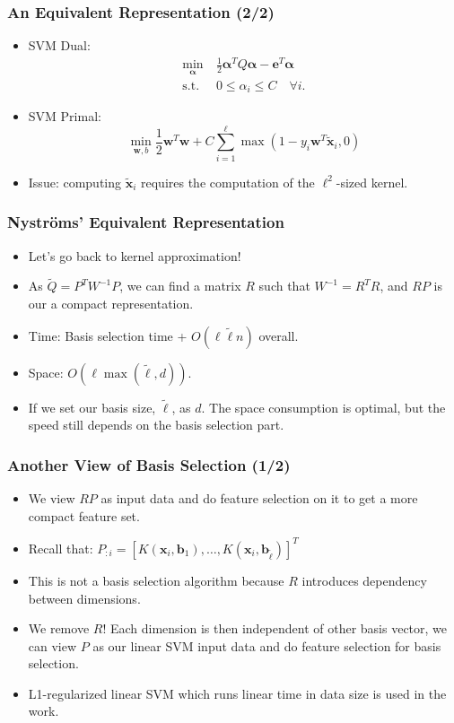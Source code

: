 \documentclass{beamer}
\def\bb{{\boldsymbol b}}
\def\bw{{\boldsymbol w}}
\def\balpha{{\boldsymbol \alpha}}
\def\bb{{\boldsymbol b}}
\def\be{{\boldsymbol e}}
\def\bx{{\boldsymbol x}}
\begin{document}
\begin{frame}
  \frametitle{An Equivalent Representation (2/2)}
  \begin{itemize}
    \item SVM Dual: 
    \begin{align}
    \min_{\balpha} \  &  \frac{1}{2} \balpha^T Q  \balpha - \be^T \balpha \nonumber \\
    \mbox{s.t.} \  & 0 \le \alpha_i \le C \quad \forall i \mbox{.} \nonumber
    \end{align}
    \pause
    \item SVM Primal:
    \begin{equation}
      \min_{\bw, b}
      \frac{1}{2} \bw^T\bw + C\sum_{i=1}^\ell \max(1-y_i\bw^T\tilde{\bx}_i, 0) \nonumber
    \end{equation} 
    \pause
    \item Issue: computing $\tilde{\bx}_i$ requires the computation of the $\ell^2$-sized kernel.
  \end{itemize}
\end{frame}

\begin{frame}
  \frametitle{Nystr\"oms' Equivalent Representation}
  \begin{itemize}
    \item Let's go back to kernel approximation!
    \pause
    \item As $\tilde{Q} = P^TW^{-1}P$, we can find a matrix $R$ such that $W^{-1} = R^TR$, and $RP$ is our a compact representation.
    \pause
    \item [] Time: Basis selection time + $O(\ell \tilde{\ell} n)$ overall.
    \item [] Space: $O(\ell \max(\tilde{\ell}, d))$.
    \pause
    \item If we set our basis size, $\tilde{\ell}$, as $d$. The space consumption is optimal, but the speed still depends on the basis selection part.
  \end{itemize}
\end{frame}

\begin{frame}
  \frametitle{Another View of Basis Selection (1/2)}
  \begin{itemize}
    \item We view $RP$ as input data and do feature selection on it to get a more compact feature set.
    \item Recall that: $P_{:i} = [K(\bx_i, \bb_1), \dots, K(\bx_i, \bb_{\tilde{\ell}})]^T$
    \item This is not a basis selection algorithm because $R$ introduces dependency between dimensions.
    \pause
    \item We remove $R$! Each dimension is then independent of other basis vector, we can view $P$ as our linear SVM input data and do feature selection for basis selection. 
    \item L1-regularized linear SVM which runs linear time in data size is used in the work.
  \end{itemize}
\end{frame}
\end{document}
